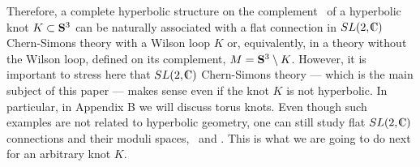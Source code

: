 Therefore, a complete hyperbolic structure on
the complement \mkcompl\ of a hyperbolic knot $K \subset \S^3$
can be naturally associated with a flat connection
in $SL(2,\IC)$ Chern-Simons theory with a Wilson loop $K$
or, equivalently, in a theory without the Wilson loop,
defined on its complement, $M = \S^3 \setminus K$.
However, it is important to stress here that $SL(2,\IC)$
Chern-Simons theory --- which is the main subject of this
paper --- makes sense even if the knot $K$ is not hyperbolic.
In particular, in Appendix B we will discuss torus knots.
Even though such examples are not related to hyperbolic geometry,
one can still study flat $SL(2,\IC)$ connections and their
moduli spaces, \generall\ and \generalp.
This is what we are going to do next for an arbitrary knot $K$.

\ifig{}
{}

